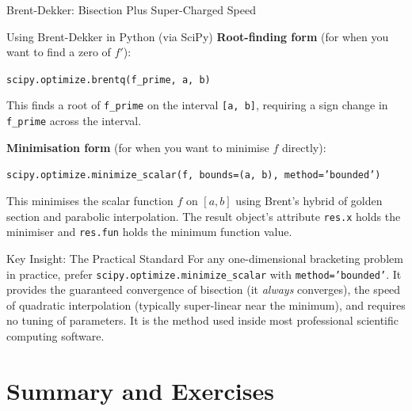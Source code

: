 \documentclass[aspectratio=169,10pt]{beamer}
\begin{document}
\begin{frame}[allowframebreaks]{Brent-Dekker: Bisection Plus Super-Charged Speed}
\begin{block}{Using Brent-Dekker in Python (via SciPy)}
    \textbf{Root-finding form} (for when you want to find a zero of $f'$):
    \begin{center}
      \texttt{scipy.optimize.brentq(f\_prime, a, b)}
    \end{center}
    This finds a root of \texttt{f\_prime} on the interval
    \texttt{[a, b]}, requiring a sign change in \texttt{f\_prime} across
    the interval.

    \textbf{Minimisation form} (for when you want to minimise $f$ directly):
    \begin{center}
      \texttt{scipy.optimize.minimize\_scalar(f, bounds=(a, b), method='bounded')}
    \end{center}
    This minimises the scalar function $f$ on $[a, b]$ using Brent's hybrid
    of golden section and parabolic interpolation.  The result object's
    attribute \texttt{res.x} holds the minimiser and \texttt{res.fun} holds
    the minimum function value.
  \end{block}

  \begin{alertblock}{Key Insight: The Practical Standard}
    For any one-dimensional bracketing problem in practice, prefer
    \texttt{scipy.optimize.minimize\_scalar} with \texttt{method='bounded'}.
    It provides the guaranteed convergence of bisection (it \emph{always}
    converges), the speed of quadratic interpolation (typically super-linear
    near the minimum), and requires no tuning of parameters.  It is the
    method used inside most professional scientific computing software.
  \end{alertblock}

\end{frame}

\section{Summary and Exercises}
\end{document}
